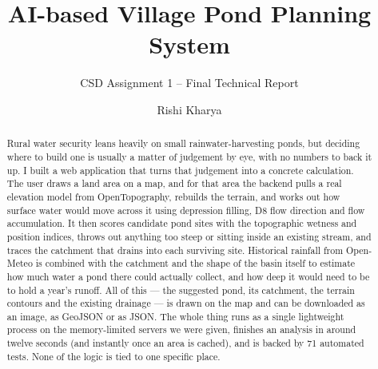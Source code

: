 \documentclass[manuscript,screen]{acmart}
\begin{document}
\title{AI-based Village Pond Planning System}
\subtitle{CSD Assignment 1 -- Final Technical Report}

\author{Rishi Kharya}

\renewcommand{\shortauthors}{Kharya}


\begin{abstract}
Rural water security leans heavily on small rainwater-harvesting ponds, but
deciding where to build one is usually a matter of judgement by eye, with no
numbers to back it up. I built a web application that turns that judgement into a
concrete calculation. The user draws a land area on a map, and for that area the
backend pulls a real elevation model from OpenTopography, rebuilds the terrain,
and works out how surface water would move across it using depression filling, D8
flow direction and flow accumulation. It then scores candidate pond sites with the
topographic wetness and position indices, throws out anything too steep or sitting
inside an existing stream, and traces the catchment that drains into each surviving
site. Historical rainfall from Open-Meteo is combined with the catchment and the
shape of the basin itself to estimate how much water a pond there could actually
collect, and how deep it would need to be to hold a year's runoff. All of this ---
the suggested pond, its catchment, the terrain contours and the existing drainage
--- is drawn on the map and can be downloaded as an image, as GeoJSON or as JSON.
The whole thing runs as a single lightweight process on the memory-limited servers
we were given, finishes an analysis in around twelve seconds (and instantly once an
area is cached), and is backed by 71 automated tests. None of the logic is tied to
one specific place.
\end{abstract}

\end{document}

